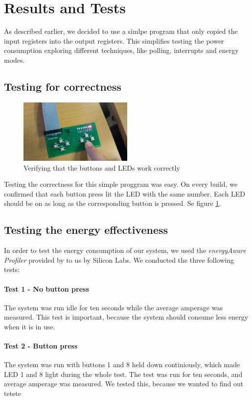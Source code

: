 \section{Results and Tests}
As described earlier, we decided to use a simlpe program that only copied the input registers into the output registers. This simplifies testing the power consumption exploring different techniques, like polling, interrupts and energy modes. 

	\subsection{Testing for correctness}
	\begin{figure}[h]
		\centerline{
			\includegraphics[width=0.5\textwidth]{img/test_correctness.jpg}
		}
		\caption{Verifying that the buttons and LEDs work correctly}
		\label{fig:test_correctness}
	\end{figure}
Testing the correctness for this simple proggram was easy. On every build, we confirmed that each button press lit the LED with the same number. Each LED should be on as long as the corresponding button is pressed. Se figure \ref{fig:test_correctness}.

	\subsection{Testing the energy effectiveness}
	In order to test the energy consumption of our system, we used the \emph{energyAware Profiler} provided by to us by Silicon Labs. We conducted the three following tests:

		\paragraph{Test 1 - No button press} 
		The system was run idle for ten seconds while the average amperage was measured. This test is important, because the system should consume less energy when it is in use.

		\paragraph{Test 2 - Button press}
		The system was run with buttons 1 and 8 held down continiously, which made LED 1 and 8 light during the whole test. The test was run for ten seconds, and average amperage was measured. We tested this, because we wanted to find out tetete

